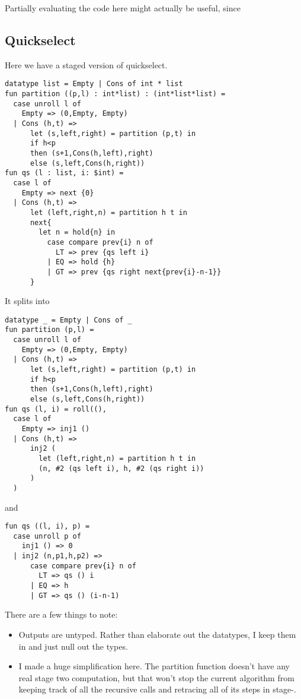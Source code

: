 Partially evaluating the code here might actually be useful, since 

\subsection{Quickselect}

Here we have a staged version of quickselect.
\begin{lstlisting} 
datatype list = Empty | Cons of int * list
fun partition ((p,l) : int*list) : (int*list*list) =
  case unroll l of 
    Empty => (0,Empty, Empty) 
  | Cons (h,t) =>
      let (s,left,right) = partition (p,t) in
      if h<p 
      then (s+1,Cons(h,left),right)
      else (s,left,Cons(h,right))
fun qs (l : list, i: $int) = 
  case l of
    Empty => next {0}
  | Cons (h,t) => 
      let (left,right,n) = partition h t in
      next{
        let n = hold{n} in
          case compare prev{i} n of
            LT => prev {qs left i}
          | EQ => hold {h}
          | GT => prev {qs right next{prev{i}-n-1}}
      }	
\end{lstlisting}
It splits into
\begin{lstlisting} 
datatype _ = Empty | Cons of _
fun partition (p,l) =
  case unroll l of 
    Empty => (0,Empty, Empty) 
  | Cons (h,t) =>
      let (s,left,right) = partition (p,t) in
      if h<p 
      then (s+1,Cons(h,left),right)
      else (s,left,Cons(h,right))
fun qs (l, i) = roll((), 
  case l of
    Empty => inj1 ()
  | Cons (h,t) => 
      inj2 (
        let (left,right,n) = partition h t in
        (n, #2 (qs left i), h, #2 (qs right i))
      )
  )
\end{lstlisting}
and 
\begin{lstlisting} 
fun qs ((l, i), p) = 
  case unroll p of
    inj1 () => 0
  | inj2 (n,p1,h,p2) => 
      case compare prev{i} n of
        LT => qs () i
      | EQ => h
      | GT => qs () (i-n-1)
\end{lstlisting}
There are a few things to note:
\begin{itemize}
\item Outputs are untyped.  Rather than elaborate out the datatypes, I keep them in and just null out the types.
\item I made a huge simplification here.  The partition function doesn't have any real stage two computation,
but that won't stop the current algorithm from keeping track of all the recursive calls and retracing all of its
steps in stage-\bbtwo.
\end{itemize}


